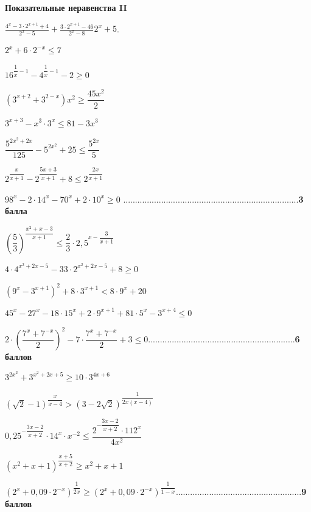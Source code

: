 \centerline{\bf \Huge Показательные неравенства II}

$\frac{4^x-3 \cdot 2^{x+1}+4}{2^x-5}+\frac{3 \cdot 2^{x+1}-46}{2^x-8}  2^x+5$.

 $2^x+6 \cdot 2^{-x} \leqslant 7$

 $16^{\dfrac{1}{x}-1}-4^{\dfrac{1}{x}-1}-2 \geqslant 0$

 $\left(3^{x+2}+3^{2-x}\right) x^2 \geqslant \dfrac{45 x^2}{2}$

 $3^{x+3}-x^3 \cdot 3^x \leqslant 81-3 x^3$

 $\dfrac{5^{2 x^2+2 x}}{125}-5^{2 x^2}+25 \leqslant \dfrac{5^{2 x}}{5}$

 $2^{\dfrac{x}{x+1}}-2^{\dfrac{5 x+3}{x+1}}+8 \leqslant 2^{\dfrac{2 x}{x+1}}$

 $98^x-2 \cdot 14^x-70^x+2 \cdot 10^x \geqslant 0$ ..........................................................................\textbf{3 балла}

 $\left(\dfrac{5}{3}\right)^{\dfrac{x^2+x-3}{x+1}} \leqslant \dfrac{2}{3} \cdot 2,5^{x-\dfrac{3}{x+1}}$

 $4 \cdot 4^{x^2+2 x-5}-33 \cdot 2^{x^2+2 x-5}+8 \geqslant 0$

 $\left(9^x-3^{x+1}\right)^2+8 \cdot 3^{x+1}<8 \cdot 9^x+20$

 $45^x-27^x-18 \cdot 15^x+2 \cdot 9^{x+1}+81 \cdot 5^x-3^{x+4} \leqslant 0$

 $2 \cdot\left(\dfrac{7^x+7^{-x}}{2}\right)^2-7 \cdot \dfrac{7^x+7^{-x}}{2}+3 \leqslant 0$..............................................................\textbf{6 баллов}


 $3^{2 x^2}+3^{x^2+2 x+5} \geqslant 10 \cdot 3^{4 x+6}$

 $(\sqrt{2}-1)^{\dfrac{x}{x-4}}>(3-2 \sqrt{2})^{\dfrac{1}{2 x(x-4)}}$


 $0,25^{-\dfrac{3 x-2}{x+2}} \cdot 14^x \cdot x^{-2} \leqslant \dfrac{2^{-\dfrac{3 x-2}{x+2}} \cdot 112^x}{4 x^2}$



 $\left(x^2+x+1\right)^{\dfrac{x+5}{x+2}} \geqslant x^2+x+1$

 $\left(2^x+0,09 \cdot 2^{-x}\right)^{\dfrac{1}{2 x}} \geqslant\left(2^x+0,09 \cdot 2^{-x}\right)^{\dfrac{1}{1-x}}$.....................................................\textbf{9 баллов}
